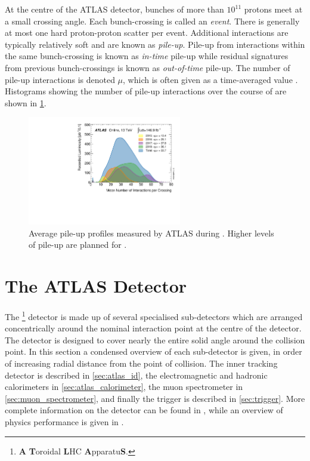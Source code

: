 At the centre of the ATLAS detector, bunches of more than $10^{11}$ protons meet at a small crossing angle.
Each bunch-crossing is called an \textit{event}.
There is generally at most one hard proton-proton scatter per event.
Additional interactions are typically relatively soft and are known as \textit{pile-up}.
Pile-up from interactions within the same bunch-crossing is known as \textit{in-time} pile-up while residual signatures from previous bunch-crossings is known as \textit{out-of-time} pile-up.
The number of pile-up interactions is denoted $\mu$, which is often given as a time-averaged value \angles{\mu}.
Histograms showing the number of pile-up interactions over the course of \runtwo are shown in \cref{fig:run2_pile-up}.
%
\begin{figure}[!htbp]
  \centering
  \includegraphics[width=0.6\textwidth]{chapters/2.detector/figs/mu_2015_2018.pdf}
  \caption{
    Average pile-up profiles measured by ATLAS during \runtwo \cite{atlas-lumi-run2}.
    Higher levels of pile-up are planned for \runthree.
  }
  \label{fig:run2_pile-up}
\end{figure}
%


\section{The ATLAS Detector}\label{sec:atlas_detector}

The \ATLAS\footnote{\textbf{A} \textbf{T}oroidal \textbf{L}HC \textbf{A}pparatu\textbf{S}.} detector is made up of several specialised sub-detectors which are arranged concentrically around the nominal interaction point at the centre of the detector.
The detector is designed to cover nearly the entire solid angle around the collision point.
In this section a condensed overview of each sub-detector is given, in order of increasing radial distance from the point of collision.
The inner tracking detector is described in \cref{sec:atlas_id}, the electromagnetic and hadronic calorimeters in \cref{sec:atlas_calorimeter}, the muon spectrometer in \cref{sec:muon_spectrometer}, and finally the trigger is described in \cref{sec:trigger}.
More complete information on the detector can be found in , while an overview of physics performance is given in \cite{ATLAS-TDR-14}.

